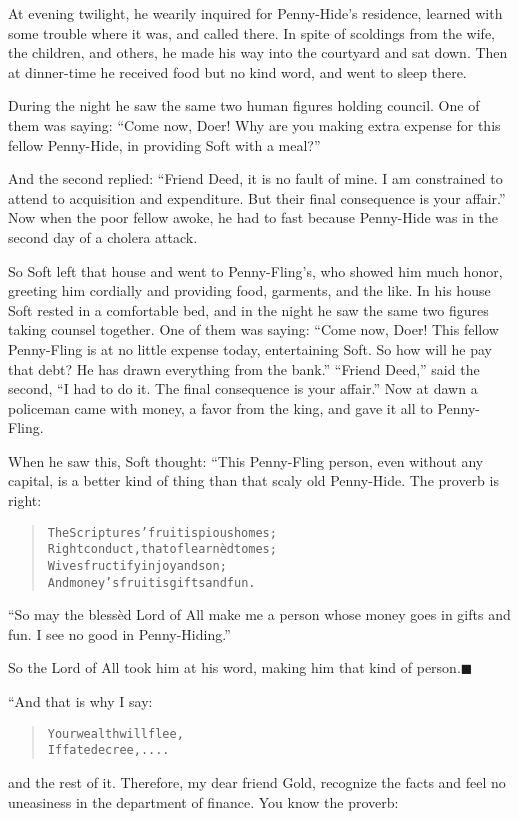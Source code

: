 \documentclass[article, twoside, 14pt]{memoir}
\newcommand{\qed}{\hfill \ensuremath{\blacksquare}}
\renewenvironment{verbatim}{%
\begin{quote}%
\vskip -10pt%
\begin{alltt}\normalfont\large}{\end{alltt}%
\end{quote}%
\vskip -10pt
} %
\begin{document}
At evening twilight, he wearily inquired for Penny-Hide's
residence, learned with some trouble where it was, and called
there. In spite of scoldings from the wife, the children, and
others, he made his way into the courtyard and sat down. Then at
dinner-time he received food but no kind word, and went to sleep
there.

During the night he saw the same two human figures holding council.
One of them was saying:
``Come now, Doer! Why are you making extra expense for this fellow Penny-Hide, in providing Soft with a meal?''

And the second replied:
``Friend Deed, it is no fault of mine. I am constrained to attend to acquisition and expenditure. But their final consequence is your affair.''
Now when the poor fellow awoke, he had to fast because Penny-Hide
was in the second day of a cholera attack.

So Soft left that house and went to Penny-Fling's, who showed him
much honor, greeting him cordially and providing food, garments,
and the like. In his house Soft rested in a comfortable bed, and in
the night he saw the same two figures taking counsel together. One
of them was saying:
``Come now, Doer! This fellow Penny-Fling is at no little expense today, entertaining Soft. So how will he pay that debt? He has drawn everything from the bank.''
``Friend Deed,'' said the second,
``I had to do it. The final consequence is your affair.'' Now at
dawn a policeman came with money, a favor from the king, and gave
it all to Penny-Fling.

When he saw this, Soft thought: “This Penny-Fling person, even
without any capital, is a better kind of thing than that scaly old
Penny-Hide. The proverb is right:

\begin{verbatim}
The Scriptures' fruit is pious homes;
Right conduct, that of learnèd tomes;
Wives fructify in joy and son;
And money's fruit is gifts and fun.
\end{verbatim}
``So may the blessèd Lord of All make me a person whose money goes in gifts and fun. I see no good in Penny-Hiding.''

So the Lord of All took him at his word, making him that kind of
person.\hyperref[s42]{\qed}

“And that is why I say:

\begin{verbatim}
Your wealth will flee,
If fate decree, ....
\end{verbatim}
and the rest of it. Therefore, my dear friend Gold, recognize the
facts and feel no uneasiness in the department of finance. You know
the proverb:
\end{document}
